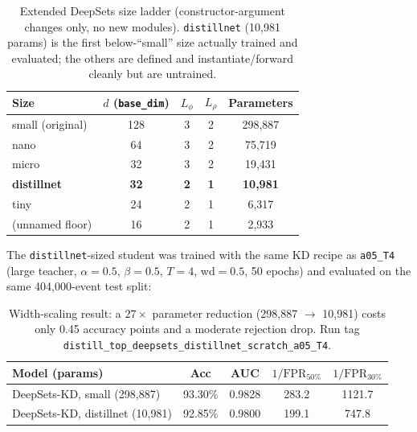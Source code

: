 \begin{table}[h]
    \centering
    \small
    \begin{tabular}{lcccc}
        \toprule
        Size & $d$ (\texttt{base\_dim}) & $L_\phi$ & $L_\rho$ & Parameters \\
        \midrule
        small (original)  & 128 & 3 & 2 & 298{,}887 \\
        nano               & 64  & 3 & 2 &  75{,}719 \\
        micro              & 32  & 3 & 2 &  19{,}431 \\
        \textbf{distillnet} & \textbf{32} & \textbf{2} & \textbf{1} & \textbf{10{,}981} \\
        tiny               & 24  & 2 & 1 &   6{,}317 \\
        (unnamed floor)    & 16  & 2 & 1 &   2{,}933 \\
        \bottomrule
    \end{tabular}
    \caption{Extended DeepSets size ladder (constructor-argument changes
    only, no new modules). \texttt{distillnet} (10{,}981 params) is the
    first below-``small'' size actually trained and evaluated; the others
    are defined and instantiate/forward cleanly but are untrained.}
    \label{tab:deepsets-size-ladder}
\end{table}

The \texttt{distillnet}-sized student was trained with the same KD recipe as
\texttt{a05\_T4} (large teacher, $\alpha{=}0.5$, $\beta{=}0.5$, $T{=}4$,
wd$=0.5$, 50 epochs) and evaluated on the same 404{,}000-event test split:

\begin{table}[h]
    \centering
    \small
    \begin{tabular}{lcccc}
        \toprule
        Model (params) & Acc & AUC & $1/\mathrm{FPR}_{50\%}$ & $1/\mathrm{FPR}_{30\%}$ \\
        \midrule
        DeepSets-KD, small (298{,}887) & 93.30\% & 0.9828 & 283.2 & 1121.7 \\
        DeepSets-KD, distillnet (10{,}981) & 92.85\% & 0.9800 & 199.1 & 747.8 \\
        \bottomrule
    \end{tabular}
    \caption{Width-scaling result: a $27\times$ parameter reduction
    (298{,}887 $\to$ 10{,}981) costs only 0.45 accuracy points and a
    moderate rejection drop. Run tag
    \texttt{distill\_top\_deepsets\_distillnet\_scratch\_a05\_T4}.}
    \label{tab:deepsets-distillnet-result}
\end{table}

